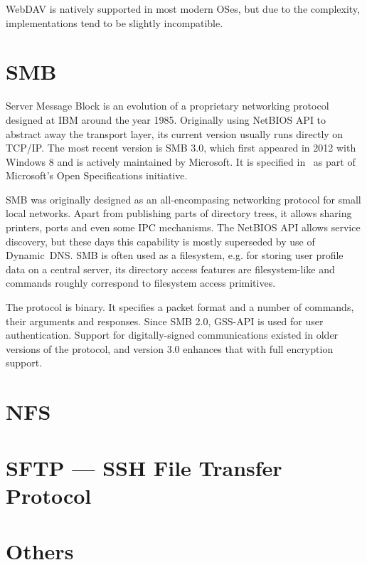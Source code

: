 WebDAV is natively supported in most modern OSes, but due to the complexity, implementations tend to be
slightly incompatible.

\section{SMB}

Server Message Block is an evolution of a proprietary networking protocol designed at IBM around the year
1985. Originally using NetBIOS API to abstract away the transport layer, its current version usually runs
directly on TCP/IP.  The most recent version is SMB 3.0, which first appeared in 2012 with Windows 8 and is
actively maintained by Microsoft. It is specified in~\cite{MS-SMB2} as part of Microsoft's Open Specifications
initiative.

SMB was originally designed as an all-encompasing networking protocol for small local networks. Apart from
publishing parts of directory trees, it allows sharing printers, ports and even some IPC mechanisms. The
NetBIOS API allows service discovery, but these days this capability is mostly superseded by use of
Dynamic~DNS. SMB is often used as a filesystem, e.g. for storing user profile data on a central server, its
directory access features are filesystem-like and commands roughly correspond to filesystem access primitives.

The protocol is binary. It specifies a packet format and a number of commands, their arguments and responses.
Since SMB 2.0, GSS-API is used for user authentication. Support for digitally-signed communications existed in
older versions of the protocol, and version 3.0 enhances that with full encryption support.

\section{NFS}

\section{SFTP --- SSH File Transfer Protocol}

\section{Others}
